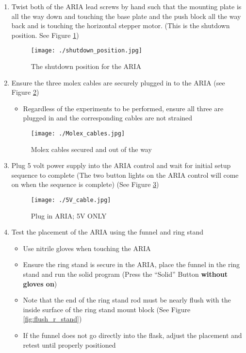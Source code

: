 \begin{enumerate}
\def\labelenumi{\arabic{enumi}.}
\setcounter{enumi}{11}
\item
  Twist both of the ARIA lead screws by hand such that the mounting
  plate is all the way down and touching the base plate and the push
  block all the way back and is touching the horizontal stepper motor.
  (This is the shutdown position. See Figure
  \ref{fig:shutdown_position})

  \begin{figure}
  \hypertarget{fig:shutdown_position}{%
  \centering
  \texttt{[image: ./shutdown\_position.jpg]}
  \caption{The shutdown position for the
  ARIA}\label{fig:shutdown_position}
  }
  \end{figure}
\item
  Ensure the three molex cables are securely plugged in to the ARIA (see
  Figure \ref{fig:Molex_cables})

  \begin{itemize}
  \tightlist
  \item
    Regardless of the experiments to be performed, ensure all three are
    plugged in and the corresponding cables are not strained
  \end{itemize}

  \begin{figure}
  \hypertarget{fig:Molex_cables}{%
  \centering
  \texttt{[image: ./Molex\_cables.jpg]}
  \caption{Molex cables secured and out of the
  way}\label{fig:Molex_cables}
  }
  \end{figure}
\item
  Plug 5 volt power supply into the ARIA control and wait for initial
  setup sequence to complete (The two button lights on the ARIA control
  will come on when the sequence is complete) (See Figure
  \ref{fig:5V_cable})

  \begin{figure}
  \hypertarget{fig:5V_cable}{%
  \centering
  \texttt{[image: ./5V\_cable.jpg]}
  \caption{Plug in ARIA; 5V ONLY}\label{fig:5V_cable}
  }
  \end{figure}
\item
  Test the placement of the ARIA using the funnel and ring stand

  \begin{itemize}
  \item
    Use nitrile gloves when touching the ARIA
  \item
    Ensure the ring stand is secure in the ARIA, place the funnel in the
    ring stand and run the solid program (Press the ``Solid'' Button
    \textbf{without gloves on})
  \item
    Note that the end of the ring stand rod must be nearly flush with
    the inside surface of the ring stand mount block (See Figure
    \ref{fig:flush_r_stand})
  \item
    If the funnel does not go directly into the flask, adjust the
    placement and retest until properly positioned


\end{itemize}
\end{enumerate}
